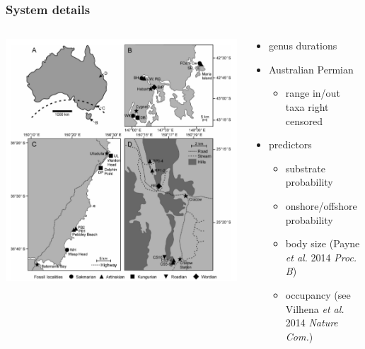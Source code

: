 \documentclass{beamer}
\begin{document}
\begin{frame}
  \frametitle{System details}
  \begin{columns}
    \begin{column}{0.5\textwidth}
      \includegraphics[height = 0.8\textheight, width = \textwidth, keepaspectratio = true]{figure/australia}

      \tiny{}
    \end{column}
    \begin{column}{0.5\textwidth}
      \begin{itemize}
        \item \alert{genus durations}
        \item Australian Permian
          \begin{itemize}
            \item range in/out taxa right censored
          \end{itemize}
        \item predictors 
          \begin{itemize}
            \item substrate probability 
            \item onshore/offshore probability
            \item body size (Payne \textit{et al.} 2014 \textit{Proc. B})
            \item occupancy (see Vilhena \textit{et al.} 2014 \textit{Nature Com.})
          \end{itemize}
      \end{itemize}
    \end{column}
  \end{columns}
\end{frame}
\end{document}
